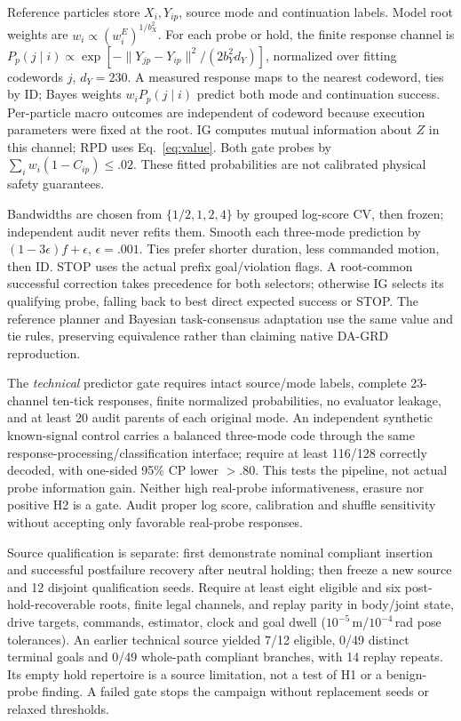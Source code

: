 Reference particles store $X_i,Y_{ip}$, source mode and continuation labels. Model root weights are $w_i\propto(w_i^E)^{1/b_X^2}$. For each probe or hold, the finite response channel is $P_p(j\mid i)\propto\exp[-\|Y_{jp}-Y_{ip}\|^2/(2b_Y^2d_Y)]$, normalized over fitting codewords $j$, $d_Y=230$. A measured response maps to the nearest codeword, ties by ID; Bayes weights $w_iP_p(j\mid i)$ predict both mode and continuation success. Per-particle macro outcomes are independent of codeword because execution parameters were fixed at the root. IG computes mutual information about $Z$ in this channel; RPD uses Eq.~\eqref{eq:value}. Both gate probes by $\sum_iw_i(1-C_{ip})\le.02$. These fitted probabilities are not calibrated physical safety guarantees.

Bandwidths are chosen from $\{1/2, 1, 2, 4\}$ by grouped log-score CV, then frozen; independent audit never refits them. Smooth each three-mode prediction by $(1-3\epsilon)f+\epsilon$, $\epsilon=.001$. Ties prefer shorter duration, less commanded motion, then ID. STOP uses the actual prefix goal/violation flags. A root-common successful correction takes precedence for both selectors; otherwise IG selects its qualifying probe, falling back to best direct expected success or STOP. The reference planner and Bayesian task-consensus adaptation use the same value and tie rules, preserving equivalence rather than claiming native DA-GRD reproduction.

The \emph{technical} predictor gate requires intact source/mode labels, complete 23-channel ten-tick responses, finite normalized probabilities, no evaluator leakage, and at least 20 audit parents of each original mode. An independent synthetic known-signal control carries a balanced three-mode code through the same response-processing/classification interface; require at least 116/128 correctly decoded, with one-sided 95\% CP lower $>.80$. This tests the pipeline, not actual probe information gain. Neither high real-probe informativeness, erasure nor positive H2 is a gate. Audit proper log score, calibration and shuffle sensitivity without accepting only favorable real-probe responses.

Source qualification is separate: first demonstrate nominal compliant insertion and successful postfailure recovery after neutral holding; then freeze a new source and 12 disjoint qualification seeds. Require at least eight eligible and six post-hold-recoverable roots, finite legal channels, and replay parity in body/joint state, drive targets, commands, estimator, clock and goal dwell ($10^{-5}$\,m/$10^{-4}$\,rad pose tolerances). An earlier technical source yielded 7/12 eligible, 0/49 distinct terminal goals and 0/49 whole-path compliant branches, with 14 replay repeats. Its empty hold repertoire is a source limitation, not a test of H1 or a benign-probe finding. A failed gate stops the campaign without replacement seeds or relaxed thresholds.

